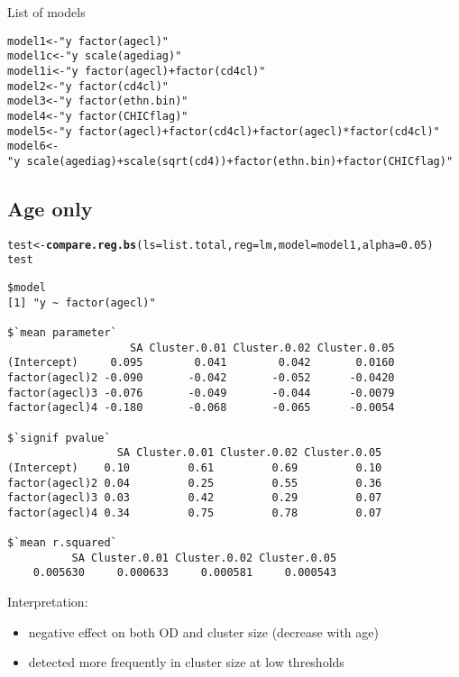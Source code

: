 \documentclass[]{revtex4}\usepackage[]{graphicx}\usepackage[]{color}
\makeatletter
\newcommand{\hlnum}[1]{\textcolor[rgb]{0.686,0.059,0.569}{#1}}%
\newcommand{\hlstr}[1]{\textcolor[rgb]{0.192,0.494,0.8}{#1}}%
\newcommand{\hlstd}[1]{\textcolor[rgb]{0.345,0.345,0.345}{#1}}%
\newcommand{\hlkwb}[1]{\textcolor[rgb]{0.69,0.353,0.396}{#1}}%
\newcommand{\hlkwc}[1]{\textcolor[rgb]{0.333,0.667,0.333}{#1}}%
\newcommand{\hlkwd}[1]{\textcolor[rgb]{0.737,0.353,0.396}{\textbf{#1}}}%
\newenvironment{kframe}{%
 \def\at@end@of@kframe{}%
 \ifinner\ifhmode%
  \def\at@end@of@kframe{\end{minipage}}%
  \begin{minipage}{\columnwidth}%
 \fi\fi%
 \def\FrameCommand##1{\hskip\@totalleftmargin \hskip-\fboxsep
 \colorbox{shadecolor}{##1}\hskip-\fboxsep
     \hskip-\linewidth \hskip-\@totalleftmargin \hskip\columnwidth}%
 \MakeFramed {\advance\hsize-\width
   \@totalleftmargin\z@ \linewidth\hsize
   \@setminipage}}%
 {\par\unskip\endMakeFramed%
 \at@end@of@kframe}
\newenvironment{knitrout}{}{} %
\makeatother
\begin{document}
List of models
\begin{knitrout}
\color{fgcolor}\begin{kframe}
\begin{alltt}
\hlstd{model1} \hlkwb{<-} \hlstr{"y ~ factor(agecl)"}
\hlstd{model1c} \hlkwb{<-} \hlstr{"y ~ scale(agediag)"}
\hlstd{model1i} \hlkwb{<-} \hlstr{"y ~ factor(agecl) + factor(cd4cl)"}
\hlstd{model2} \hlkwb{<-} \hlstr{"y ~ factor(cd4cl)"}
\hlstd{model3} \hlkwb{<-} \hlstr{"y ~ factor(ethn.bin)"}
\hlstd{model4} \hlkwb{<-} \hlstr{"y ~ factor(CHICflag)"}
\hlstd{model5} \hlkwb{<-} \hlstr{"y ~ factor(agecl) + factor(cd4cl) + factor(agecl)*factor(cd4cl) "}
\hlstd{model6} \hlkwb{<-} \hlstr{"y ~ scale(agediag) + scale(sqrt(cd4)) + factor(ethn.bin) + factor(CHICflag)"}
\end{alltt}
\end{kframe}
\end{knitrout}

\subsection*{Age only}
\begin{knitrout}
\color{fgcolor}\begin{kframe}
\begin{alltt}
\hlstd{test} \hlkwb{<-} \hlkwd{compare.reg.bs}\hlstd{(}\hlkwc{ls} \hlstd{= list.total,} \hlkwc{reg} \hlstd{= lm,} \hlkwc{model} \hlstd{= model1,} \hlkwc{alpha} \hlstd{=} \hlnum{0.05}\hlstd{)}
\hlstd{test}
\end{alltt}
\begin{verbatim}
$model
[1] "y ~ factor(agecl)"

$`mean parameter`
                   SA Cluster.0.01 Cluster.0.02 Cluster.0.05
(Intercept)     0.095        0.041        0.042       0.0160
factor(agecl)2 -0.090       -0.042       -0.052      -0.0420
factor(agecl)3 -0.076       -0.049       -0.044      -0.0079
factor(agecl)4 -0.180       -0.068       -0.065      -0.0054

$`signif pvalue`
                 SA Cluster.0.01 Cluster.0.02 Cluster.0.05
(Intercept)    0.10         0.61         0.69         0.10
factor(agecl)2 0.04         0.25         0.55         0.36
factor(agecl)3 0.03         0.42         0.29         0.07
factor(agecl)4 0.34         0.75         0.78         0.07

$`mean r.squared`
          SA Cluster.0.01 Cluster.0.02 Cluster.0.05 
    0.005630     0.000633     0.000581     0.000543 
\end{verbatim}
\end{kframe}
\end{knitrout}
Interpretation: 
\begin{itemize}
\item negative effect on both OD and cluster size (decrease with age)
\item detected more frequently in cluster size at low thresholds
\end{itemize}
\end{document}
